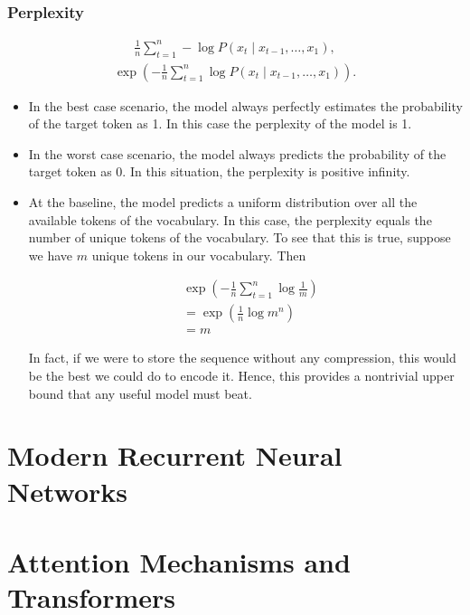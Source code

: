 \documentclass[a4paper,12pt]{article}
\theoremstyle{definition}
\begin{document}
\subsubsection*{Perplexity}
\begin{align*}
    \frac{1}{n} \sum_{t=1}^n -\log P(x_t \mid x_{t-1}, \ldots, x_1),
\end{align*}
\begin{align*}
    \exp\left(-\frac{1}{n} \sum_{t=1}^n \log P(x_t \mid x_{t-1}, \ldots, x_1)\right).
\end{align*}

\begin{itemize}
\item In the best case scenario, the model always perfectly estimates the probability of the target token as 1. 
In this case the perplexity of the model is 1.

\item In the worst case scenario, the model always predicts the probability of the target token as 0. 
In this situation, the perplexity is positive infinity.

\item At the baseline, the model predicts a uniform distribution over all the available tokens of the vocabulary. 
In this case, the perplexity equals the number of unique tokens of the vocabulary. To see that this is true, suppose we have $m$
unique tokens in our vocabulary. Then

\begin{align*}
    & \exp\left(-\frac{1}{n} \sum_{t=1}^n \log \frac{1}{m} \right) \\
    &= \exp\left(\frac{1}{n} \log m^n \right) \\
    &= m
\end{align*}

In fact, if we were to store the 
sequence without any compression, this would be the best we could do to encode it. Hence, this provides a nontrivial 
upper bound that any useful model must beat.

\end{itemize}

\section{Modern Recurrent Neural Networks}

\section{Attention Mechanisms and Transformers}
\end{document}
